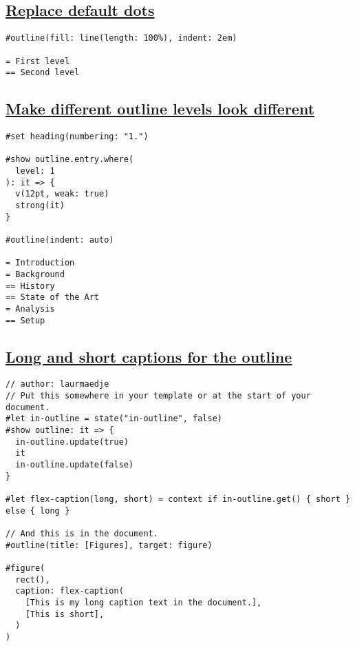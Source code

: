 \pandocbounded{}

\subsection{\texorpdfstring{\hyperref[replace-default-dots]{Replace
default dots}}{Replace default dots}}\label{replace-default-dots}

\begin{verbatim}
#outline(fill: line(length: 100%), indent: 2em)

= First level
== Second level
\end{verbatim}

\pandocbounded{}

\subsection{\texorpdfstring{\hyperref[make-different-outline-levels-look-different]{Make
different outline levels look
different}}{Make different outline levels look different}}\label{make-different-outline-levels-look-different}

\begin{verbatim}
#set heading(numbering: "1.")

#show outline.entry.where(
  level: 1
): it => {
  v(12pt, weak: true)
  strong(it)
}

#outline(indent: auto)

= Introduction
= Background
== History
== State of the Art
= Analysis
== Setup
\end{verbatim}

\pandocbounded{}

\subsection{\texorpdfstring{\hyperref[long-and-short-captions-for-the-outline]{Long
and short captions for the
outline}}{Long and short captions for the outline}}\label{long-and-short-captions-for-the-outline}

\begin{verbatim}
// author: laurmaedje
// Put this somewhere in your template or at the start of your document.
#let in-outline = state("in-outline", false)
#show outline: it => {
  in-outline.update(true)
  it
  in-outline.update(false)
}

#let flex-caption(long, short) = context if in-outline.get() { short } else { long }

// And this is in the document.
#outline(title: [Figures], target: figure)

#figure(
  rect(),
  caption: flex-caption(
    [This is my long caption text in the document.],
    [This is short],
  )
)
\end{verbatim}

